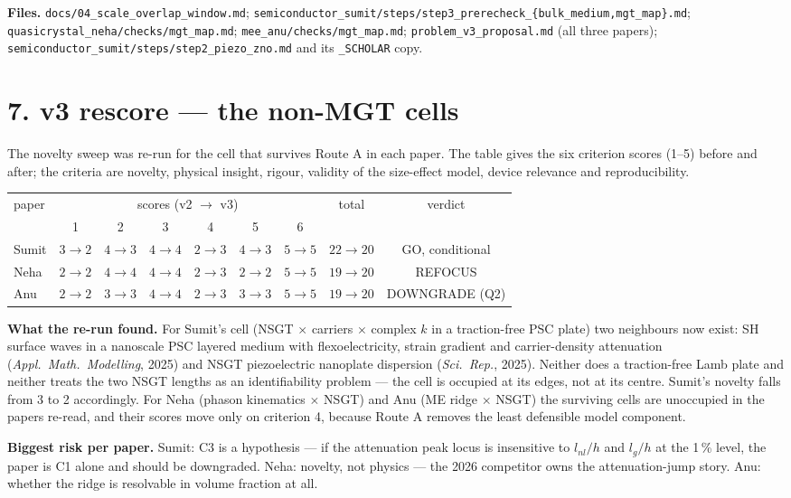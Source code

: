 \documentclass[11pt]{article}
\begin{document}
\noindent\textbf{Files.} \texttt{docs/04\_scale\_overlap\_window.md};
\texttt{semiconductor\_sumit/steps/step3\_prerecheck\_\{bulk\_medium,mgt\_map\}.md};
\texttt{quasicrystal\_neha/checks/mgt\_map.md}; \texttt{mee\_anu/checks/mgt\_map.md};
\texttt{problem\_v3\_proposal.md} (all three papers);
\texttt{semiconductor\_sumit/steps/step2\_piezo\_zno.md} and its \texttt{\_SCHOLAR} copy.


\section*{7. v3 rescore --- the non-MGT cells}

The novelty sweep was re-run for the cell that survives Route A in each paper. The table gives the six
criterion scores (1--5) before and after; the criteria are novelty, physical insight, rigour, validity
of the size-effect model, device relevance and reproducibility.

\begin{center}\small
\begin{tabular}{lcccccccc}
\toprule
paper & \multicolumn{6}{c}{scores (v2 $\to$ v3)} & total & verdict\\
 & 1 & 2 & 3 & 4 & 5 & 6 & & \\
\midrule
Sumit & $3\to2$ & $4\to3$ & $4\to4$ & $2\to3$ & $4\to3$ & $5\to5$ & $22\to20$ & GO, conditional\\
Neha  & $2\to2$ & $4\to4$ & $4\to4$ & $2\to3$ & $2\to2$ & $5\to5$ & $19\to20$ & REFOCUS\\
Anu   & $2\to2$ & $3\to3$ & $4\to4$ & $2\to3$ & $3\to3$ & $5\to5$ & $19\to20$ & DOWNGRADE (Q2)\\
\bottomrule
\end{tabular}
\end{center}

\textbf{What the re-run found.} For Sumit's cell (NSGT $\times$ carriers $\times$ complex $k$ in a
traction-free PSC plate) two neighbours now exist: SH surface waves in a nanoscale PSC layered medium
with flexoelectricity, strain gradient and carrier-density attenuation (\emph{Appl.\ Math.\ Modelling},
2025) and NSGT piezoelectric nanoplate dispersion (\emph{Sci.\ Rep.}, 2025). Neither does a
traction-free Lamb plate and neither treats the two NSGT lengths as an identifiability problem --- the
cell is occupied at its edges, not at its centre. Sumit's novelty falls from 3 to 2 accordingly. For
Neha (phason kinematics $\times$ NSGT) and Anu (ME ridge $\times$ NSGT) the surviving cells are
unoccupied in the papers re-read, and their scores move only on criterion 4, because Route A removes the
least defensible model component.

\textbf{Biggest risk per paper.} Sumit: C3 is a hypothesis --- if the attenuation peak locus is
insensitive to $l_{nl}/h$ and $l_g/h$ at the 1\,\% level, the paper is C1 alone and should be
downgraded. Neha: novelty, not physics --- the 2026 competitor owns the attenuation-jump story. Anu:
whether the ridge is resolvable in volume fraction at all.
\end{document}
